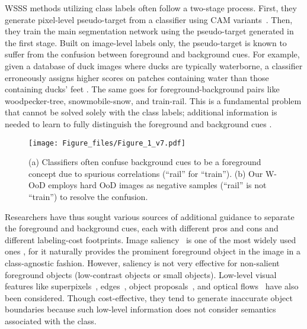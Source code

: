 \documentclass[10pt,twocolumn,letterpaper]{article}
\begin{document}
WSSS methods utilizing class labels often follow a two-stage process. First, they generate pixel-level pseudo-target from a classifier using CAM variants~\cite{zhou2016learning,selvaraju2017grad}. Then, they train the main segmentation network using the pseudo-target generated in the first stage. 
Built on image-level labels only, the pseudo-target is known to suffer from the confusion between foreground and background cues. For example, given a database of duck images where ducks are typically waterborne, a classifier erroneously assigns higher scores on patches containing water than those containing ducks' feet \cite{choe2020evaluating,li2019guided, zhang2020causal, lee2021reducing, lee2021railroad, kolesnikov2016improving}. The same goes for foreground-background pairs like woodpecker-tree, snowmobile-snow, and train-rail. This is a fundamental problem that cannot be solved solely with the class labels; additional information is needed to learn to fully distinguish the foreground and background cues \cite{choe2020evaluating, li2019guided, lee2021railroad}.


\begin{figure}[t]
\centering
\texttt{[image: Figure\_files/Figure\_1\_v7.pdf]}
\vspace{-2em}
\caption{\label{fig1} (a) Classifiers often confuse background cues to be a foreground concept due to spurious correlations (\eg ``rail'' for ``train''). (b) Our W-OoD employs hard OoD images as negative samples (\eg ``rail'' is not ``train'') to resolve the confusion.}
\vspace{-1.3em}
\end{figure}
 
Researchers have thus sought various sources of additional guidance to separate the foreground and background cues, each with different pros and cons and different labeling-cost footprints. Image saliency~\cite{li2014secrets, liu2010learning} is one of the most widely used ones \cite{lee2019ficklenet, lee2021railroad, yao2021nonsalient, sun2020mining, liu2020leveraging, joon2017exploiting}, for it naturally provides the prominent foreground object in the image in a class-agnostic fashion. However, saliency is not very effective for non-salient foreground objects (\eg low-contrast objects or small objects). Low-level visual features like superpixels~\cite{kwak2017weakly, wang2018weakly}, edges~\cite{ke2021universal}, object proposals~\cite{lee2021bbam, song2019box, liu2020leveraging}, and optical flows~\cite{hong2017weakly, lee2019frame} have also been considered. 
Though cost-effective, they tend to generate inaccurate object boundaries because such low-level information does not consider semantics associated with the class.
\end{document}

